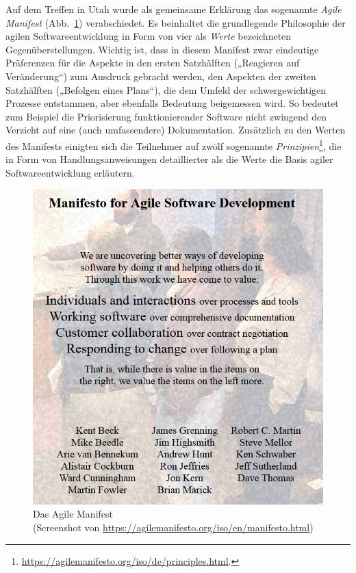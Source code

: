 Auf  dem Treffen in Utah wurde als gemeinsame Erklärung das sogenannte 
\textit{Agile Manifest} (Abb.~\ref{fig:das_agile_manifest}) verabschiedet. Es beinhaltet die grundlegende Philosophie der agilen Softwareentwicklung in Form von vier als \textit{Werte} bezeichneten Gegenüber\-stellungen. Wichtig ist, dass in diesem Manifest zwar eindeutige Präferenzen für die Aspekte in den ersten Satzhälften (\zb „Reagieren auf Veränderung“) zum Ausdruck gebracht werden, den Aspekten der zweiten Satzhälften (\zb „Befolgen eines Plans“), die dem Umfeld der schwergewichtigen Prozesse entstammen, aber ebenfalls Bedeutung beigemessen wird. So bedeutet zum Beispiel die Priorisierung funktionierender Software nicht zwingend den Verzicht auf eine (auch umfassendere) Dokumentation. Zusätzlich zu den Werten des Manifests einigten sich die Teilnehmer auf zwölf sogenannte \textit{Prinzipien}\footnote{\href{https://agilemanifesto.org/iso/de/principles.html}{https://agilemanifesto.org/iso/de/principles.html}.}, 
die in Form von Handlungsanweisungen detaillierter als die Werte die Basis agiler Softwareentwicklung erläutern.

\begin{figure}[h!]
    \centering
    \includegraphics[scale=0.5]{Bilder/Kapitel-2/ScreenshotAgilesManifest.png}
    \caption[Das Agile Manifest]{Das Agile Manifest\\ (Screenshot von \href{https://agilemanifesto.org/iso/en/manifesto.html}{https://agilemanifesto.org/iso/en/manifesto.html})}
    \label{fig:das_agile_manifest}
\end{figure}

